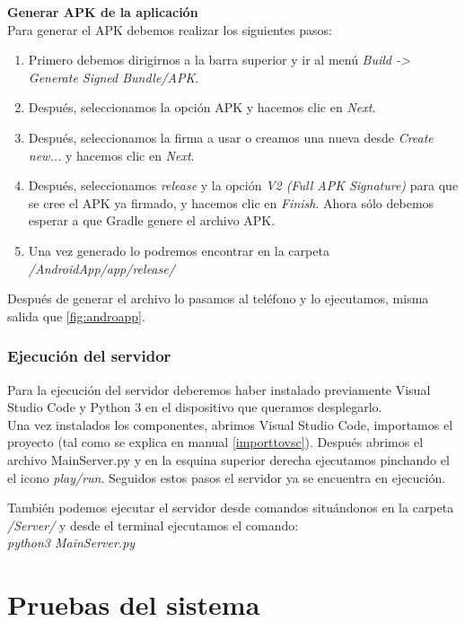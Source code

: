 \textbf{Generar APK de la aplicación}\\
Para generar el APK debemos realizar los siguientes pasos:
\begin{enumerate}
\item
	Primero debemos dirigirnos a la barra superior y ir al menú \textit{Build -> Generate Signed Bundle/APK}.
\item
	Después, seleccionamos la opción APK y hacemos clic en \textit{Next}.
\item
	Después, seleccionamos la firma a usar o creamos una nueva desde \textit{Create new...} y hacemos clic en \textit{Next}.
\item
	Después, seleccionamos \textit{release} y la opción \textit{V2 (Full APK Signature)} para que se cree el APK ya firmado, y hacemos clic en \textit{Finish}. Ahora sólo debemos esperar a que Gradle genere el archivo APK.
\item
	Una vez generado lo podremos encontrar en la carpeta \textit{/AndroidApp/app/release/}
\end{enumerate}

Después de generar el archivo lo pasamos al teléfono y lo ejecutamos, misma salida que \ref{fig:androapp}.

\subsubsection{Ejecución del servidor}

Para la ejecución del servidor deberemos haber instalado previamente Visual Studio Code y Python 3 en el dispositivo que queramos desplegarlo.\\
Una vez instalados los componentes, abrimos Visual Studio Code, importamos el proyecto (tal como se explica en manual \ref{importtovsc}).
Después abrimos el archivo MainServer.py y en la esquina superior derecha ejecutamos pinchando el el icono \textit{play/run}. 
Seguidos estos pasos el servidor ya se encuentra en ejecución.

También podemos ejecutar el servidor desde comandos situándonos en la carpeta \textit{/Server/} y desde el terminal ejecutamos el comando:\\
\textit{python3 MainServer.py}



\section{Pruebas del sistema}













